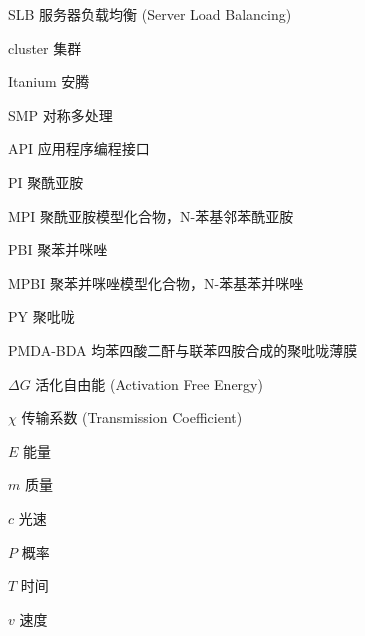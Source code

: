 \begin{denotation}[3cm]
\item[SLB] 服务器负载均衡 (Server Load Balancing)
\item[cluster] 集群
\item[Itanium] 安腾
\item[SMP] 对称多处理
\item[API] 应用程序编程接口
\item[PI] 聚酰亚胺
\item[MPI] 聚酰亚胺模型化合物，N-苯基邻苯酰亚胺
\item[PBI] 聚苯并咪唑
\item[MPBI] 聚苯并咪唑模型化合物，N-苯基苯并咪唑
\item[PY] 聚吡咙
\item[PMDA-BDA]	均苯四酸二酐与联苯四胺合成的聚吡咙薄膜
\item[$\Delta G$] 活化自由能 (Activation Free Energy)
\item[$\chi$] 传输系数 (Transmission Coefficient)
\item[$E$] 能量
\item[$m$] 质量
\item[$c$] 光速
\item[$P$] 概率
\item[$T$] 时间
\item[$v$] 速度
\end{denotation}
